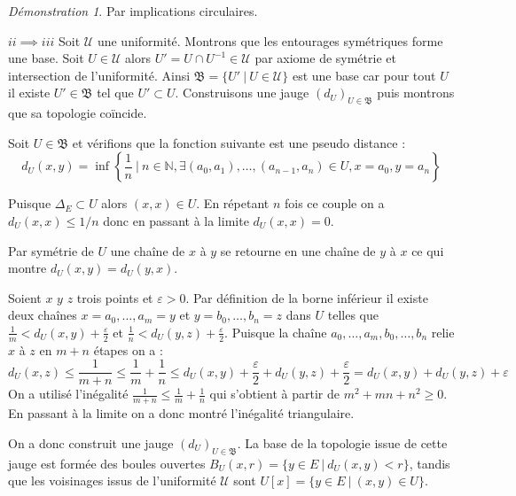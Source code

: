 \documentclass[a4paper, 11pt, french]{book}
\newenvironment{itemise}{\itemize}{\enditemize}
\theoremstyle{plain} %
\theoremstyle{definition} %
\theoremstyle{remark} %
\newtheorem*{demonstration}{Démonstration}
\newcommand{\1}{\mathds{1}}
\newcommand{\N}{\mathbb{N}}
\renewcommand{\frak}[1]{\mathfrak{#1}}
\newcommand{\scr}[1]{\mathscr{#1}}
\newcommand\ens[2]{\{#1 \ |\ #2\}}
\begin{document}
\begin{demonstration}
	Par implications circulaires.
	\begin{itemise}
		\item[$ii\implies iii$] Soit $\scr{U}$ une uniformité.
		Montrons que les entourages symétriques forme une base.
		Soit $U\in\scr{U}$ alors $U'=U\cap U^{-1}\in\scr{U}$ par axiome de symétrie et intersection de l'uniformité.
		Ainsi $\frak{B}=\ens{U'}{U\in\scr{U}}$ est une base car pour tout $U$ il existe $U'\in\frak{B}$ tel que $U'\subset U$.
		Construisons une jauge $(d_U)_{U\in\frak{B}}$ puis montrons que sa topologie coïncide. %
		\begin{itemise}
			\item Soit $U\in\frak{B}$ et vérifions que la fonction suivante est une pseudo distance :
			$$
			d_U(x, y)=\inf\left\{\frac{1}{n}\ \Big|\ n\in\N, \exists (a_0, a_1), \dots, (a_{n-1}, a_n)\in U, x=a_0, y=a_n\right\}
			$$
			\begin{itemise}
				\item Puisque $\Delta_E\subset U$ alors $(x, x)\in U$.
				En répetant $n$ fois ce couple on a $d_U(x, x)\leqslant 1/n$ donc en passant à la limite $d_U(x, x)=0$.
				\item Par symétrie de $U$ une chaîne de $x$ à $y$ se retourne en une chaîne de $y$ à $x$ ce qui montre $d_U(x, y)=d_U(y, x)$.
				\item Soient $x$ $y$ $z$ trois points et $\varepsilon>0$.
				Par définition de la borne inférieur il existe deux chaînes $x=a_0, \dots, a_m=y$ et $y=b_0, \dots, b_n=z$ dans $U$ telles que $\frac{1}{m}<d_U(x, y)+\frac{\varepsilon}{2}$ et $\frac{1}{n}<d_U(y, z)+\frac{\varepsilon}{2}$.
				Puisque la chaîne $a_0, \dots, a_m, b_0, \dots, b_n$ relie $x$ à $z$ en $m+n$ étapes on a :
				$$
				d_U(x, z)
				\leqslant\frac{1}{m+n}
				\leqslant\frac{1}{m}+\frac{1}{n}
				\leqslant d_U(x, y)+\frac{\varepsilon}{2} + d_U(y, z)+\frac{\varepsilon}{2}
				= d_U(x, y) + d_U(y, z) + \varepsilon
				$$
				On a utilisé l'inégalité $\frac{1}{m+n}\leqslant\frac{1}{m}+\frac{1}{n}$ qui s'obtient à partir de $m^2+mn+n^2\geqslant 0$.
				En passant à la limite on a donc montré l'inégalité triangulaire.
			\end{itemise}
			\item On a donc construit une jauge $(d_U)_{U\in\frak{B}}$.
			La base de la topologie issue de cette jauge est formée des boules ouvertes $B_U(x, r)=\ens{y\in E}{d_U(x, y)<r}$, tandis que les voisinages issus de l'uniformité $\scr{U}$ sont $U[x]=\ens{y\in E}{(x, y)\in U}$.

\end{itemise}
\end{itemise}
\end{demonstration}
\end{document}
